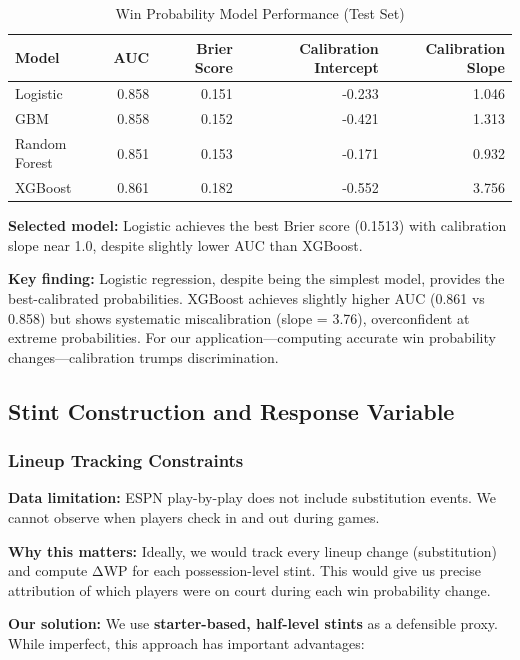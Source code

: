 \documentclass[
  letterpaper,
  DIV=11,
  numbers=noendperiod]{scrartcl}
\begin{document}
\begin{longtable}[t]{lrrrr}
\caption{\label{tab:wp-model-results}Win Probability Model Performance (Test Set)}\\
\toprule
Model & AUC & Brier Score & Calibration Intercept & Calibration Slope\\
\midrule
Logistic & 0.858 & 0.151 & -0.233 & 1.046\\
GBM & 0.858 & 0.152 & -0.421 & 1.313\\
Random Forest & 0.851 & 0.153 & -0.171 & 0.932\\
XGBoost & 0.861 & 0.182 & -0.552 & 3.756\\
\bottomrule
\end{longtable}

\textbf{Selected model:} Logistic achieves the best Brier score (0.1513)
with calibration slope near 1.0, despite slightly lower AUC than
XGBoost.

\textbf{Key finding:} Logistic regression, despite being the simplest
model, provides the best-calibrated probabilities. XGBoost achieves
slightly higher AUC (0.861 vs 0.858) but shows systematic miscalibration
(slope = 3.76), overconfident at extreme probabilities. For our
application---computing accurate win probability changes---calibration
trumps discrimination.

\subsection{Stint Construction and Response
Variable}\label{stint-construction-and-response-variable}

\subsubsection{Lineup Tracking
Constraints}\label{lineup-tracking-constraints}

\textbf{Data limitation:} ESPN play-by-play does not include
substitution events. We cannot observe when players check in and out
during games.

\textbf{Why this matters:} Ideally, we would track every lineup change
(substitution) and compute ΔWP for each possession-level stint. This
would give us precise attribution of which players were on court during
each win probability change.

\textbf{Our solution:} We use \textbf{starter-based, half-level stints}
as a defensible proxy. While imperfect, this approach has important
advantages:
\end{document}

